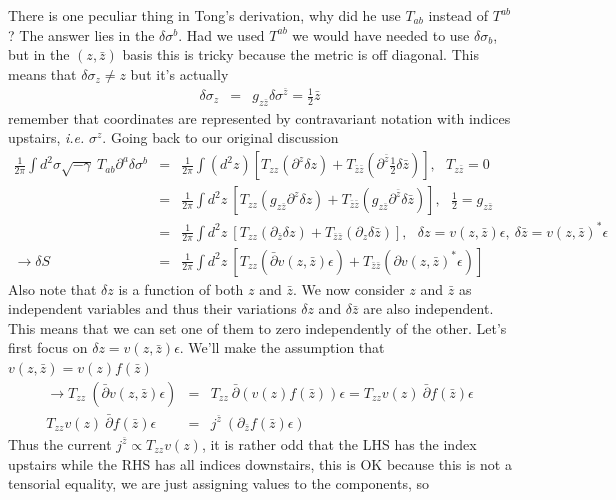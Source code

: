 \documentclass[aps,preprint,preprintnumbers,nofootinbib,showpacs,prd]{revtex4-1}
\newcommand{\ie}{{\it i.e.} }
\newcommand{\nbea}{\begin{eqnarray*}}
\newcommand{\neea}{\end{eqnarray*}}
\begin{document}
There is one peculiar thing in Tong's derivation, why did he use $T_{ab}$ instead of $T^{ab}$? The answer lies in the $\delta\sigma^b$. Had we used $T^{ab}$ we would have needed to use $\delta\sigma_b$, but in the $(z, \bar z)$ basis this is tricky because the metric is off diagonal. This means that $\delta\sigma_z \neq z$ but it's actually 
%
\nbea
\delta\sigma_z & = & g_{z \bar z}\delta\sigma^{\bar z} = \frac {1}{2} \bar z
\neea
%
remember that coordinates are represented by contravariant notation with indices upstairs, \ie $\sigma^z$. Going back to our original discussion
%
\nbea
\frac{1}{2\pi} \int d^2 \sigma \sqrt{-\gamma}  ~ T_{ab} \partial^a \delta \sigma^b & = & \frac{1}{2\pi} \int \left ( d^2 z \right ) \left \lbrack T_{zz} ( \partial^z \delta z ) + T_{\bar z \bar z} ( \partial^{\bar z} \frac{1}{2} \delta {\bar z} ) \right \rbrack , ~~~ T_{z \bar z} = 0 \\ 
& = & \frac{1}{2\pi} \int d^2 z ~ \left \lbrack T_{zz} ( g_{z \bar z} \partial^z \delta z ) + T_{\bar z \bar z} ( g_{z \bar z} \partial^{\bar z} \delta {\bar z} ) \right \rbrack , ~~~ \frac{1}{2} = g_{z \bar z}\\ 
& = & \frac{1}{2\pi} \int d^2 z ~ \left \lbrack T_{zz} ( \partial_{\bar z} \delta z ) + T_{\bar z \bar z} ( \partial_{z} \delta {\bar z} ) \right \rbrack, ~~~ \delta z = v(z,\bar z) \epsilon,~ \delta \bar z = v(z,\bar z)^* \epsilon \\ 
\longrightarrow \delta S & = & \frac{1}{2\pi} \int d^2 z ~ \left \lbrack T_{zz} ( \bar \partial v(z,\bar z) \epsilon ) + T_{\bar z \bar z} ( \partial v(z,\bar z)^* \epsilon ) \right \rbrack
\neea
%
Also note that $\delta z$ is a function of both $z$ and $\bar z$. We now consider $z$ and $\bar z$ as independent variables and thus their variations $\delta z$ and $\delta \bar z$ are also independent. This means that we can set one of them to zero independently of the other. Let's first focus on $\delta z = v(z, \bar z) \epsilon$. We'll make the assumption that $v(z, \bar z) = v(z) f (\bar z)$
%
\nbea
\rightarrow T_{zz} ~ ( \bar \partial v(z,\bar z) \epsilon ) & = & T_{zz} ~\bar \partial ( v(z) f (\bar z) ) \epsilon = T_{zz} v(z) ~ \bar \partial f (\bar z) \epsilon \\
T_{zz} v(z) ~ \bar \partial f (\bar z) \epsilon & = & j^{\bar z} ~(\partial_{\bar z} f (\bar z) \epsilon)
\neea
%
Thus the current $j^{\bar z} \propto T_{zz} v(z)$, it is rather odd that the LHS has the index upstairs while the RHS has all indices downstairs, this is OK because this is not a tensorial equality, we are just assigning values to the components, so
\end{document}
